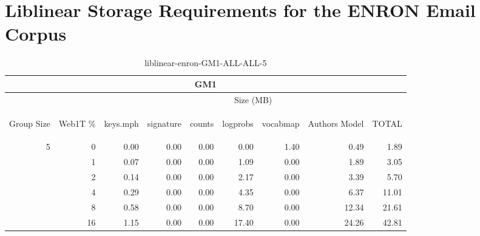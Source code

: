 \chapter{Liblinear Storage Requirements for the ENRON Email Corpus}

\begin{center}
\begin{table}[htbp]
\begin{tabular}{ | r | r | r | r | r | r | r | r | r |}
\hline
\multicolumn{9}{|c|}{GM1}\\
\hline
 & & \multicolumn{7}{|c|}{Size (MB)}\\ \cline{3-9}
\begin{sideways}Group Size\end{sideways} & \begin{sideways}Web1T \% \end{sideways} & \begin{sideways}keys.mph\end{sideways} & \begin{sideways}signature\end{sideways} & \begin{sideways}counts\end{sideways} & \begin{sideways}logprobs\end{sideways} & \begin{sideways}vocabmap\end{sideways} & \begin{sideways}Authors Model \end{sideways} & \begin{sideways}TOTAL\end{sideways}\\
\hline
\multirow{5}{*}{5}
 & 0 & 0.00 & 0.00 & 0.00 & 0.00 & 1.40 & 0.49 & 1.89\\ \cline{2-9}
 & 1 & 0.07 & 0.00 & 0.00 & 1.09 & 0.00 & 1.89 & 3.05\\ \cline{2-9}
 & 2 & 0.14 & 0.00 & 0.00 & 2.17 & 0.00 & 3.39 & 5.70\\ \cline{2-9}
 & 4 & 0.29 & 0.00 & 0.00 & 4.35 & 0.00 & 6.37 & 11.01\\ \cline{2-9}
 & 8 & 0.58 & 0.00 & 0.00 & 8.70 & 0.00 & 12.34 & 21.61\\ \cline{2-9}
 & 16 & 1.15 & 0.00 & 0.00 & 17.40 & 0.00 & 24.26 & 42.81\\ \cline{2-9}
\hline
\end{tabular}
\caption{liblinear-enron-GM1-ALL-ALL-5}
\label{table:liblinear-enron-GM1-ALL-ALL-5}
\end{table}
\end{center}

